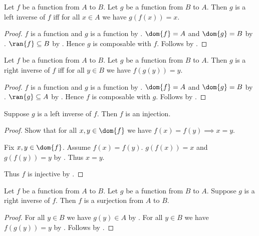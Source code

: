 \begin{proposition}\label{leftinverse_from_to_iff}
    Let $f$ be a function from $A$ to $B$.
    Let $g$ be a function from $B$ to $A$.
    Then $g$ is a left inverse of $f$ iff
        for all $x\in A$ we have $g(f(x))=x$.
\end{proposition}
\begin{proof}
    $f$ is a function and $g$ is a function
        by .
    $\dom{f}=A$ and $\dom{g}=B$ by .
    $\ran{f}\subseteq B$ by .
    Hence $g$ is composable with $f$.
    Follows by .
\end{proof}

\begin{proposition}\label{rightinverse_from_to_iff}
    Let $f$ be a function from $A$ to $B$.
    Let $g$ be a function from $B$ to $A$.
    Then $g$ is a right inverse of $f$ iff
        for all $y\in B$ we have $f(g(y))=y$.
\end{proposition}
\begin{proof}
    $f$ is a function and $g$ is a function
        by .
    $\dom{f}=A$ and $\dom{g}=B$ by .
    $\ran{g}\subseteq A$ by .
    Hence $f$ is composable with $g$.
    Follows by .
\end{proof}

\begin{proposition}\label{leftinverse_implies_injection}
    Suppose $g$ is a left inverse of $f$.
    Then $f$ is an injection.
\end{proposition}
\begin{proof}
    Show that for all $x,y\in\dom{f}$ we have
        $f(x)=f(y)\implies x=y$.
    \begin{subproof}
        Fix $x,y\in\dom{f}$.
        Assume $f(x)=f(y)$.
        $g(f(x))=x$ and $g(f(y))=y$ by .
        Thus $x=y$.
    \end{subproof}
    Thus $f$ is injective by .
\end{proof}

\begin{proposition}\label{rightinverse_implies_surjection}
    Let $f$ be a function from $A$ to $B$.
    Let $g$ be a function from $B$ to $A$.
    Suppose $g$ is a right inverse of $f$.
    Then $f$ is a surjection from $A$ to $B$.
\end{proposition}
\begin{proof}
    For all $y\in B$ we have $g(y)\in A$
        by .
    For all $y\in B$ we have $f(g(y))=y$
        by .
    Follows by .
\end{proof}

